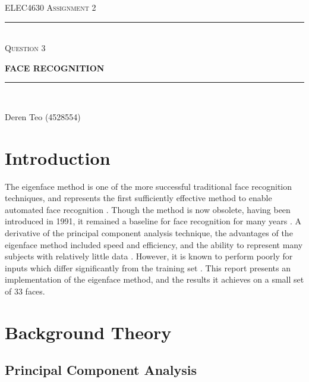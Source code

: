 \begin{titlepage}
  \centering

  \textsc{ELEC4630 Assignment 2}\\
  \vspace{9cm}

  \rule{\linewidth}{0.5pt}\\

  \vspace{1em}
  \LARGE\textsc{Question 3}\\
  \vspace{1em}

  \LARGE\uppercase{\textbf{{Face Recognition}}}\\

  \rule{\linewidth}{2pt}\\

  \vfill

  \normalsize{Deren Teo (4528554)}
  \vspace{1cm}

\end{titlepage}

\section{Introduction}

The eigenface method is one of the more successful traditional face recognition techniques, and represents the first sufficiently effective method to enable automated face recognition \cite{rosebrock_2021}. Though the method is now obsolete, having been introduced in 1991, it remained a baseline for face recognition for many years \cite{elec4630_2023}. A derivative of the principal component analysis technique, the advantages of the eigenface method included speed and efficiency, and the ability to represent many subjects with relatively little data \cite{turk_1991}. However, it is known to perform poorly for inputs which differ significantly from the training set \cite{turk_1991}. This report presents an implementation of the eigenface method, and the results it achieves on a small set of 33 faces.

\section{Background Theory}

\subsection{Principal Component Analysis}

